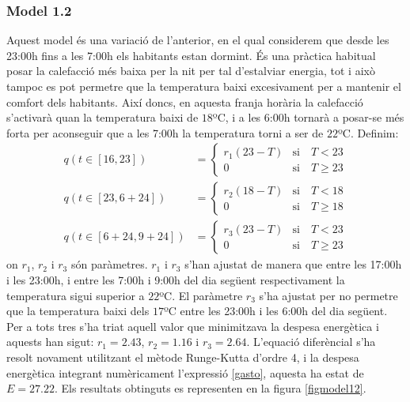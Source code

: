 \documentclass[11pt]{article}
\begin{document}
	\subsubsection*{Model 1.2}
	Aquest model és una variació de l'anterior, en el qual considerem que desde les 23:00h fins a les 7:00h els habitants estan dormint. És una pràctica habitual posar la calefacció més baixa per la nit per tal d'estalviar energia, tot i això tampoc es pot permetre que la temperatura baixi excesivament per a mantenir el comfort dels habitants. Així doncs, en aquesta franja horària la calefacció s'activarà quan la temperatura baixi de $18$ºC, i a les 6:00h tornarà a posar-se més forta per aconseguir que a les 7:00h la temperatura torni a ser de $22$ºC. Definim:
\begin{align} 
q(t\in[16,23])&=
\begin{cases}
r_1(23-T)&\text{si}\quad T<23\\
0&\text{si}\quad T\geq23
\end{cases}
\\
q(t\in[23,6+24])&=
\begin{cases}\label{caiguda}
r_2(18-T)&\text{si}\quad T<18\\
0&\text{si}\quad T\geq18
\end{cases}
\\
q(t\in[6+24,9+24])&=
\begin{cases}
r_3(23-T)&\text{si}\quad T<23\\
0&\text{si}\quad T\geq23
\end{cases}
\end{align}
on $r_1$, $r_2$ i $r_3$ són paràmetres. $r_1$ i $r_3$ s'han ajustat de manera que entre les 17:00h i les 23:00h, i entre les 7:00h i 9:00h del dia següent respectivament la temperatura sigui superior a $22$ºC. El paràmetre $r_3$ s'ha ajustat per no permetre que la temperatura baixi dels $17$ºC entre les 23:00h i les 6:00h del dia següent. Per a tots tres s'ha triat aquell valor que minimitzava la despesa energètica i aquests han sigut: $r_1=2.43$, $r_2=1.16$ i $r_3=2.64$. L'equació diferèncial s'ha resolt novament utilitzant el mètode Runge-Kutta d'ordre 4, i la despesa energètica integrant numèricament l'expressió \eqref{gasto}, aquesta ha estat de $E=27.22$. Els resultats obtinguts es representen en la figura \ref{figmodel12}.\\
\end{document}
